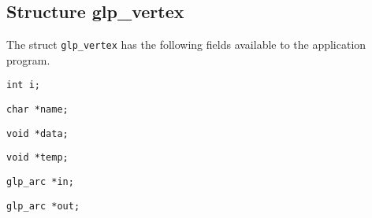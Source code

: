 \documentclass[11pt]{report}
\def\para#1{\noindent{\bf#1}}
\begin{document}
\subsection{Structure glp\_vertex}

The struct \verb|glp_vertex| has the following fields available to the
application program.

\noindent
\verb|int i;|

\begin{comment}Ordinal number of the vertex, $1\leq i\leq nv$. Note
that element $v[i]$ in the struct \verb|glp_graph| points to the vertex,
whose ordinal number is $i$.
\end{comment}

\noindent
\verb|char *name;|

\begin{comment}Symbolic name assigned to the vertex. It is a pointer to
a null terminated character string of length from 1 to 255 characters.
If no name is assigned to the vertex, this field contains \verb|NULL|.
\end{comment}

\noindent
\verb|void *data;|

\begin{comment}Pointer to a data block associated with the vertex. This
data block is automatically allocated on creating a new vertex and freed
on deleting the vertex. If $v\_size=0$, the block is not allocated, and
this field contains \verb|NULL|.
\end{comment}

\noindent
\verb|void *temp;|

\begin{comment}Working pointer, which may be used freely for any
purposes. The application program can change this field directly.
\end{comment}

\noindent
\verb|glp_arc *in;|

\begin{comment}Pointer to the (unordered) list of incoming arcs. If the
vertex has no incoming arcs, this field contains \verb|NULL|.
\end{comment}

\noindent
\verb|glp_arc *out;|

\begin{comment}Pointer to the (unordered) list of outgoing arcs. If the
vertex has no outgoing arcs, this field contains \verb|NULL|.
\end{comment}
\end{document}
